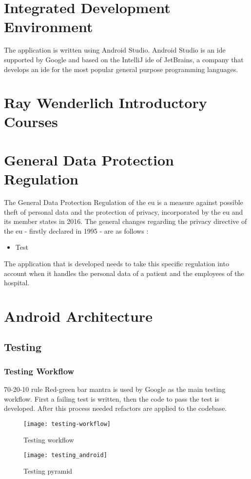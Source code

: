 \section{Integrated Development Environment}
The application is written using Android Studio. Android Studio is an \acrshort{ide} supported by Google and based on the IntelliJ \acrshort{ide} of JetBrains, a company that develops an \acrshort{ide} for the most popular general purpose programming languages.
\section{Ray Wenderlich Introductory Courses}
\section{General Data Protection Regulation}
The General Data Protection Regulation of the \acrfull{eu} is a measure against possible theft of personal data and the protection of privacy, incorporated by the \acrshort{eu} and its member states in 2016. The general changes regarding the privacy directive of the \acrshort{eu} - firstly declared in 1995 - are as follows \cite{THEEUROPEANPARLIAMENTANDTHECOUNCILOF1995} \cite{EUGDPRPortal:byTrunomi2019}:
\begin{itemize}
\item Test
\end{itemize}

The application that is developed needs to take this specific regulation into account when it handles the personal data of a patient and the employees of the hospital. 
\section{Android Architecture}
\subsection{Testing}
\subsubsection{Testing Workflow}
70-20-10 rule
Red-green bar mantra is used by Google as the main testing workflow. First a failing test is written, then the code to pass the test is developed. After this process needed refactors are applied to the codebase.
\begin{figure}
\texttt{[image: testing-workflow]}
\centering
\caption{Testing workflow~\cite{Google_testing2017}}
\end{figure}
\begin{figure}[h!]
\texttt{[image: testing\_android]}
\centering
\caption{Testing pyramid~\cite{FernandoSproviero2018}}
\end{figure}
